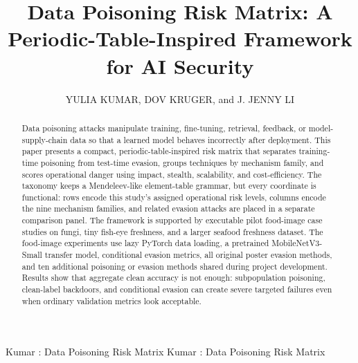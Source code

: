 ﻿\documentclass[6p,10pt,times]{ieeeaccess}
\begin{document}

\title{Data Poisoning Risk Matrix: A Periodic-Table-Inspired Framework for AI Security}

\author{\uppercase{Yulia Kumar},
\uppercase{Dov Kruger}, and
\uppercase{J. Jenny Li}}

\address[1]{Department of Computer Science and Technology, Kean University, Union, NJ 07083 USA (e-mail: ykumar@kean.edu; juli@kean.edu)}
\address[2]{Department of Electrical and Computer Engineering, Rutgers University, Piscataway, NJ 08854 USA (e-mail: Dov.Kruger@rutgers.edu)}


\markboth
{Kumar \headeretal: Data Poisoning Risk Matrix}
{Kumar \headeretal: Data Poisoning Risk Matrix}


\begin{abstract}
Data poisoning attacks manipulate training, fine-tuning, retrieval, feedback, or model-supply-chain data so that a learned model behaves incorrectly after deployment. This paper presents a compact, periodic-table-inspired risk matrix that separates training-time poisoning from test-time evasion, groups techniques by mechanism family, and scores operational danger using impact, stealth, scalability, and cost-efficiency. The taxonomy keeps a Mendeleev-like element-table grammar, but every coordinate is functional: rows encode this study's assigned operational risk levels, columns encode the nine mechanism families, and related evasion attacks are placed in a separate comparison panel. The framework is supported by executable pilot food-image case studies on fungi, tiny fish-eye freshness, and a larger seafood freshness dataset. The food-image experiments use lazy PyTorch data loading, a pretrained MobileNetV3-Small transfer model, conditional evasion metrics, all original poster evasion methods, and ten additional poisoning or evasion methods shared during project development. Results show that aggregate clean accuracy is not enough: subpopulation poisoning, clean-label backdoors, and conditional evasion can create severe targeted failures even when ordinary validation metrics look acceptable.
\end{abstract}
\end{document}
